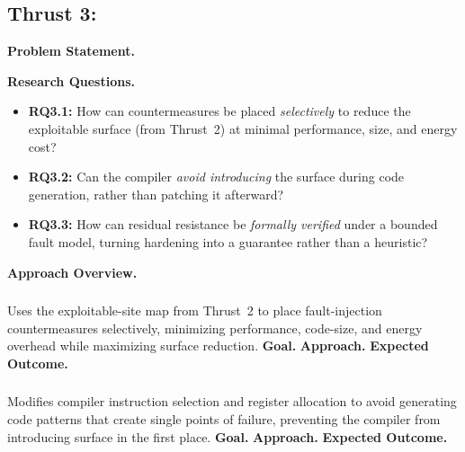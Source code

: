 \subsection{Thrust 3: \thrustthree}
\label{sec:thrust3}

\noindent\textbf{Problem Statement.}

\smallskip
\noindent\textbf{Research Questions.}
\begin{itemize}[leftmargin=*,nosep]
  \item \textbf{RQ3.1:} How can countermeasures be placed \emph{selectively} to reduce the exploitable surface (from Thrust~2) at minimal performance, size, and energy cost?
  \item \textbf{RQ3.2:} Can the compiler \emph{avoid introducing} the surface during code generation, rather than patching it afterward?
  \item \textbf{RQ3.3:} How can residual resistance be \emph{formally verified} under a bounded fault model, turning hardening into a guarantee rather than a heuristic?
\end{itemize}

\smallskip
\noindent\textbf{Approach Overview.}

\subsubsection{\researchthreeone}
Uses the exploitable-site map from Thrust~2 to place fault-injection countermeasures selectively, minimizing performance, code-size, and energy overhead while maximizing surface reduction.
\noindent\textbf{Goal.} %
\noindent\textbf{Approach.} %
\noindent\textbf{Expected Outcome.} %

\subsubsection{\researchthreetwo}
Modifies compiler instruction selection and register allocation to avoid generating code patterns that create single points of failure, preventing the compiler from introducing surface in the first place.
\noindent\textbf{Goal.} %
\noindent\textbf{Approach.} %
\noindent\textbf{Expected Outcome.} %

